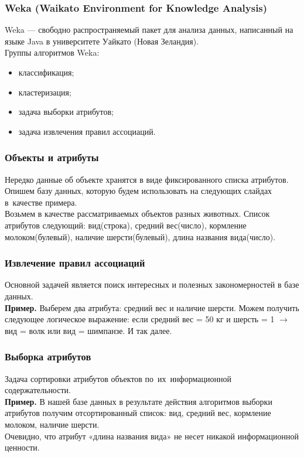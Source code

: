 \documentclass{beamer}
\begin{document}
\begin{frame}
\frametitle{Weka (Waikato Environment for Knowledge Analysis)}

Weka --- свободно распространяемый пакет для анализа данных,
написанный на языке Java в университете Уайкато (Новая Зеландия). \\

\vspace{1cm}
Группы алгоритмов Weka:
\begin{itemize}
\item{классификация;}
\item{кластеризация;}
\item{задача выборки атрибутов;}
\item{задача извлечения правил ассоциаций.}
\end{itemize}

\end{frame}

\begin{frame}
\frametitle{Объекты и атрибуты}
Нередко данные  об объекте хранятся в виде фиксированного списка атрибутов.\\
\vspace{1cm}
Опишем базу данных, которую будем использовать на следующих слайдах в~качестве примера.\\
\vspace{1cm}
Возьмем в качестве рассматриваемых объектов разных животных.
Список атрибутов следующий:
вид(строка), средний вес(число), кормление молоком(булевый), наличие шерсти(булевый), длина названия вида(число).
\end{frame}

\begin{frame}
\frametitle{Извлечение правил ассоциаций}
Основной задачей является поиск интересных и полезных закономерностей в базе данных.\\
\vspace{1cm}
{\bf Пример.}
Выберем два атрибута: средний вес и наличие шерсти.
Можем получить следующее логическое выражение: 
если средний вес = 50 кг и шерсть = 1  $\to$ вид = волк или вид = шимпанзе.
И так далее.

\end{frame}

\begin{frame}
\frametitle{Выборка атрибутов}
Задача сортировки атрибутов объектов по~их~информационной содержательности.\\
\vspace{1cm}
{\bf Пример.}
\vspace{1cm}
В нашей базе данных в результате действия алгоритмов выборки атрибутов получим отсортированный список: вид, средний вес, кормление молоком, наличие шерсти.\\
Очевидно, что атрибут «длина названия вида» не несет никакой информационной ценности.
\end{frame}
\end{document}
